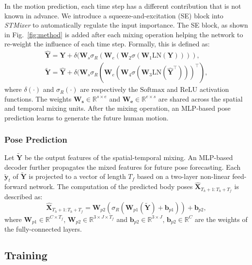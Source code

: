 \documentclass{article}
\begin{document}
In the motion prediction, each time step has a different contribution that is not known in advance. We introduce a squeeze-and-excitation (SE) block \cite{hu2018squeeze} into \textit{STMixer} to automatically regulate the input importance. The SE block, as shown in Fig.~\ref{fig:method} is added after each mixing operation helping the network to re-weight the influence of each time step. Formally, this is defined as:
\begin{align}
\label{eq:seq_exc}
\hat{\mathbf{Y}} = \mathbf{Y} + \delta (\mathbf{W}_{s} \sigma_R (\mathbf{W}_{e} (\mathbf{W}_2 \sigma(\mathbf{W}_1\text{LN}(\mathbf{Y})))),\\
\widetilde{\mathbf{Y}} = \hat{\mathbf{Y}} + \delta (\mathbf{W}_{s} \sigma_R (\mathbf{W}_{e} (\mathbf{W}_4 \sigma(\mathbf{W}_3\text{LN}(\hat{\mathbf{Y}}^\top)))^\top),\nonumber
\end{align}
where $\delta (\cdot) $ and $ \sigma_R (\cdot)$ are respectively the $\text{Softmax}$  and $\text{ReLU}$ activation functions. The weights $\mathbf{W_s} \in \mathbb{R}^{s\times e}$ and $\mathbf{W_e} \in \mathbb{R}^{e\times s}$ are shared across the spatial and temporal mixing units. After the mixing operation, an MLP-based pose prediction learns to generate the future human motion. 

\subsubsection{Pose Prediction}
Let $\mathbf{\widetilde{Y}}$ be the output features of the spatial-temporal mixing. An MLP-based decoder further propagates the mixed features for future pose forecasting. Each $\mathbf{\widetilde{y}}_t$ of $\mathbf{\widetilde{Y}}$ is projected to a vector of length $T_f$ based on a two-layer non-linear feed-forward network. The computation of the predicted body poses $\mathbf{\hat X}_{T_h+1: T_h+T_f}$ is described as:
\begin{equation}
\mathbf{\hat X}_{T_h+1: T_h+T_f} = \mathbf{W}_{p2}(\sigma_{R}(\mathbf{W}_{p1}(\mathbf{\widetilde{Y}})+\mathbf{b}_{p1}))+ \mathbf{b}_{p2},
\end{equation}
where $\mathbf{W}_{p1} \in \mathbb{R}^{C\times T_f}$, $\mathbf{W}_{p2} \in \mathbb{R}^{3\times J\times T_f}$ and $\mathbf{b}_{p2} \in \mathbb{R}^{3\times J}$, $\mathbf{b}_{p2} \in \mathbb{R}^{C}$ are the weights of the fully-connected layers. 

\subsection{Training}
\end{document}
